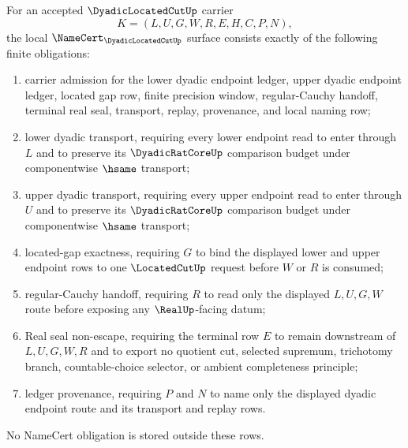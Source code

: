 \begin{theorem}
\label{thm:dyadic-located-cut-namecert-obligations}
For an accepted $\DyadicLocatedCutUp$ carrier
$$
K=(L,U,G,W,R,E,H,C,P,N),
$$
the local $\NameCert_{\DyadicLocatedCutUp}$ surface consists exactly of the following finite obligations:
\begin{enumerate}
\item carrier admission for the lower dyadic endpoint ledger, upper dyadic endpoint ledger, located gap row, finite precision window, regular-Cauchy handoff, terminal real seal, transport, replay, provenance, and local naming row;
\item lower dyadic transport, requiring every lower endpoint read to enter through $L$ and to preserve its $\DyadicRatCoreUp$ comparison budget under componentwise $\hsame$ transport;
\item upper dyadic transport, requiring every upper endpoint read to enter through $U$ and to preserve its $\DyadicRatCoreUp$ comparison budget under componentwise $\hsame$ transport;
\item located-gap exactness, requiring $G$ to bind the displayed lower and upper endpoint rows to one $\LocatedCutUp$ request before $W$ or $R$ is consumed;
\item regular-Cauchy handoff, requiring $R$ to read only the displayed $L,U,G,W$ route before exposing any $\RealUp$-facing datum;
\item Real seal non-escape, requiring the terminal row $E$ to remain downstream of $L,U,G,W,R$ and to export no quotient cut, selected supremum, trichotomy branch, countable-choice selector, or ambient completeness principle;
\item ledger provenance, requiring $P$ and $N$ to name only the displayed dyadic endpoint route and its transport and replay rows.
\end{enumerate}
No NameCert obligation is stored outside these rows.
\end{theorem}
